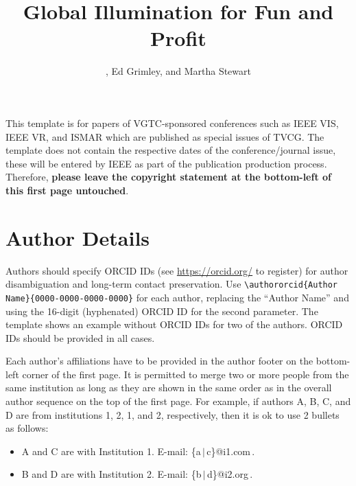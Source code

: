 \documentclass[journal]{vgtc}                %
\title{Global Illumination for Fun and Profit}
\author{%
  \authororcid{Josiah S.\ Carberry}{0000-0002-1825-0097},
  Ed Grimley, and 
  Martha Stewart
}
\begin{document}


\maketitle


This template is for papers of VGTC-sponsored conferences such as IEEE VIS, IEEE VR, and ISMAR which are published as special issues of TVCG.
The template does not contain the respective dates of the conference/journal issue, these will be entered by IEEE as part of the publication production process.
Therefore, \textbf{please leave the copyright statement at the bottom-left of this first page untouched}.


\section{Author Details}

Authors should specify ORCID IDs (see \url{https://orcid.org/}  to register) for author disambiguation and long-term contact preservation.
Use \verb|\authororcid{Author Name}{0000-0000-0000-0000}| for each author, replacing the ``Author Name'' and using the 16-digit (hyphenated) ORCID ID for the second parameter.
The template shows an example without ORCID IDs for two of the authors.
ORCID IDs should be provided in all cases.

Each author's affiliations have to be provided in the author footer on the bottom-left corner of the first page.
It is permitted to merge two or more people from the same institution as long as they are shown in the same order as in the overall author sequence on the top of the first page.
For example, if authors A, B, C, and D are from institutions 1, 2, 1, and 2, respectively, then it is ok to use 2 bullets as follows:
\begin{itemize}
  \item A and C are with Institution 1. E-mail: \{a\,$|$\,c\}@i1.com\,.

  \item B and D are with Institution 2. E-mail: \{b\,$|$\,d\}@i2.org\,.
\end{itemize}
\end{document}
